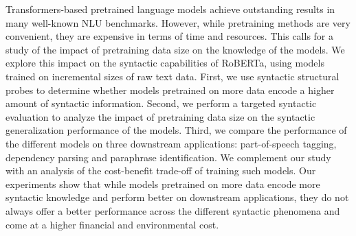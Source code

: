Transformers-based pretrained language models achieve outstanding results in many well-known NLU benchmarks. However, while pretraining methods are very convenient, they are expensive in terms of time and resources. This calls for a study of the impact of pretraining data size on the knowledge of the models.  We explore this impact on the syntactic capabilities of RoBERTa, using models trained on incremental sizes of raw text data. First, we use syntactic structural probes to determine whether models pretrained on more data encode a higher amount of syntactic information. Second, we perform a targeted syntactic evaluation to analyze the impact of pretraining data size on the syntactic generalization performance of the models. Third, we compare the performance of the different models on three downstream applications: part-of-speech tagging, dependency parsing and paraphrase identification. We complement our study with an analysis of the cost-benefit trade-off of training such models. Our experiments show that while models pretrained on more data encode more syntactic knowledge and perform better on downstream applications, they do not always offer a better performance across the different syntactic phenomena and come at a higher financial and environmental cost.

